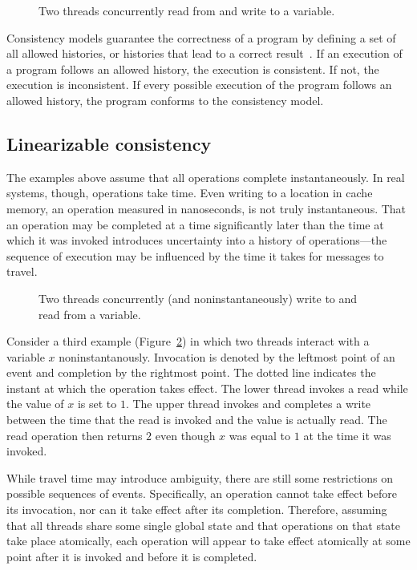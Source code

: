\documentclass{sig-alternate}
\begin{document}
\begin{figure}[ht]
  \centering
  \resizebox{\linewidth}{!}{}
  \caption{Two threads concurrently read from and write to a variable.}
\label{figure:multiple}
\end{figure}

Consistency models guarantee the correctness of a program by defining a set of all allowed histories, or histories that lead to a correct result~\cite{Ziv2015}. If an execution of a program follows an allowed history, the execution is consistent. If not, the execution is inconsistent. If every possible execution of the program follows an allowed history, the program conforms to the consistency model.

\subsection{Linearizable consistency}

The examples above assume that all operations complete instantaneously. In real systems, though, operations take time. Even writing to a location in cache memory, an operation measured in nanoseconds, is not truly instantaneous. That an operation may be completed at a time significantly later than the time at which it was invoked introduces uncertainty into a history of operations---the sequence of execution may be influenced by the time it takes for messages to travel.

\begin{figure}[ht]
  \centering
  \resizebox{0.63\linewidth}{!}{}
  \caption{Two threads concurrently (and noninstantaneously) write to and read from a variable.}
\label{figure:time}
\end{figure}

Consider a third example (Figure~\ref{figure:time}) in which two threads interact with a variable $x$ noninstantanously. Invocation is denoted by the leftmost point of an event and completion by the rightmost point. The dotted line indicates the instant at which the operation takes effect. The lower thread invokes a read while the value of $x$ is set to $1$. The upper thread invokes and completes a write between the time that the read is invoked and the value is actually read. The read operation then returns $2$ even though $x$ was equal to $1$ at the time it was invoked.

While travel time may introduce ambiguity, there are still some restrictions on possible sequences of events. Specifically, an operation cannot take effect before its invocation, nor can it take effect after its completion. Therefore, assuming that all threads share some single global state and that operations on that state take place atomically, each operation will appear to take effect atomically at some point after it is invoked and before it is completed.
\end{document}
